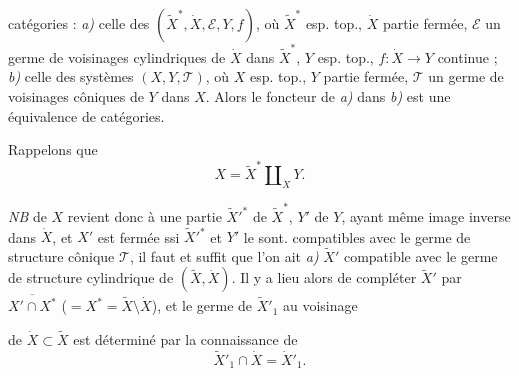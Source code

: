 \documentclass[11pt,a4paper]{article}
\begin{document}


\ill{}  catégories \struck{\ill{}} : \emph{a)} celle des   $(\tilde X^{*},\dot X,\mathcal E,Y,f)$, où $\tilde X^{*}$ esp. top., $\dot X$ partie fermée, $\mathcal E$ un germe de voisinages cylindriques de $\dot X$ dans $\tilde X^{*}$, $Y$ esp. top., $f:\dot X\to Y$  continue ; \emph{b)} celle des systèmes $(X,Y,\mathcal T)$, où $X$ esp. top., $Y$ partie fermée, $\mathcal T$ un germe de voisinages côniques de $Y$ dans $X$.  Alors le foncteur   de \emph{a)} dans \emph{b)} est une équivalence de catégories.

Rappelons que
\[
X=\tilde X^{*}\amalg_{\dot X}Y .
\]


\emph{NB}   de $X$ revient donc à une partie $\tilde X'^{*}$ de $\tilde X^{*}$, $Y'$ de $Y$, ayant même image inverse dans $\dot X$, et $X'$ est fermée ssi $\tilde X'^{*}$ et $Y'$ le sont.   compatibles avec le germe de structure cônique $\mathcal T$,  il faut et suffit que l'on ait \emph{a)} $\tilde X'$ compatible avec le germe de structure cylindrique de $(\tilde X,\dot X)$. Il y a lieu alors de compléter $\tilde X'$ par $\overline{X'\cap X^{*}}$ ($=X^{*}=\tilde X\setminus\dot X$), et le germe de $\tilde X'_1$ au voisinage


de $\dot X\subset\tilde X$ est déterminé par la connaissance de
\[
\tilde X'_1\cap\dot X=\dot X'_1 .
\]
\end{document}
